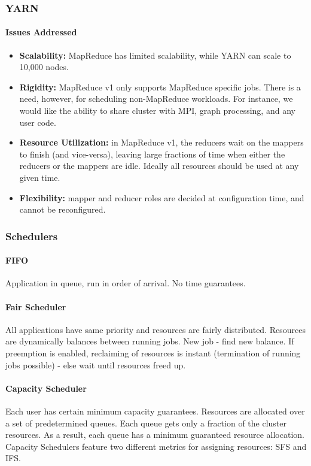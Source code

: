 \subsubsection{YARN}

\paragraph{Issues Addressed}
\begin{itemize}
    \item \textbf{Scalability:} MapReduce has limited scalability, while YARN can scale to 10,000 nodes.
    \item \textbf{Rigidity:} MapReduce v1 only supports MapReduce specific jobs. There is a need, however, for scheduling non-MapReduce workloads. For instance, we would like the ability to share cluster with MPI, graph processing, and any user code.
    \item \textbf{Resource Utilization:} in MapReduce v1, the reducers wait on the mappers to finish (and vice-versa), leaving large fractions of time when either the reducers or the mappers are idle. Ideally all resources should be used at any given time.
    \item \textbf{Flexibility:} mapper and reducer roles are decided at configuration time, and cannot be reconfigured.
\end{itemize}


\subsubsection{Schedulers}

\paragraph{FIFO}
Application in queue, run in order of arrival. No time guarantees.

\paragraph{Fair Scheduler}
All applications have same priority and resources are fairly distributed. Resources are dynamically balances between running jobs. New job - find new balance. If preemption is enabled, reclaiming of resources is instant (termination of running jobs possible) - else wait until resources freed up.

\paragraph{Capacity Scheduler}
Each user has certain minimum capacity guarantees. Resources are allocated over a set of predetermined queues. Each queue gets only a fraction of the cluster resources. As a result, each queue has a minimum guaranteed resource allocation. Capacity Schedulers feature two different metrics for assigning resources: SFS and IFS. %

